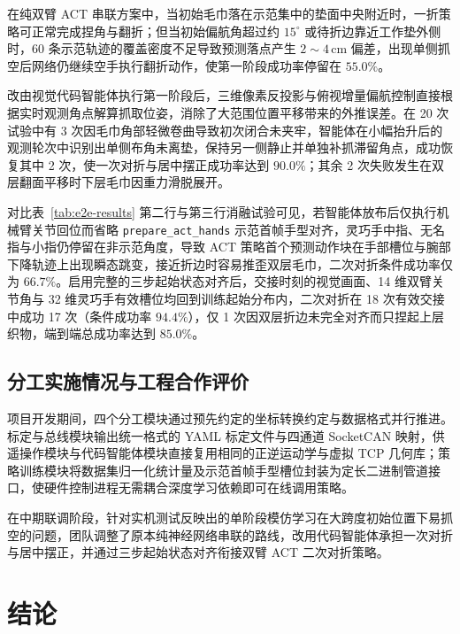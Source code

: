 在纯双臂 ACT 串联方案中，当初始毛巾落在示范集中的垫面中央附近时，一折策略可正常完成捏角与翻折；但当初始偏航角超过约 $15^{\circ}$ 或待折边靠近工作垫外侧时，60 条示范轨迹的覆盖密度不足导致预测落点产生 $2\sim 4\,\mathrm{cm}$ 偏差，出现单侧抓空后网络仍继续空手执行翻折动作，使第一阶段成功率停留在 $55.0\%$。

改由视觉代码智能体执行第一阶段后，三维像素反投影与俯视增量偏航控制直接根据实时观测角点解算抓取位姿，消除了大范围位置平移带来的外推误差。在 20 次试验中有 3 次因毛巾角部轻微卷曲导致初次闭合未夹牢，智能体在小幅抬升后的观测轮次中识别出单侧布角未离垫，保持另一侧静止并单独补抓滞留角点，成功恢复其中 2 次，使一次对折与居中摆正成功率达到 $90.0\%$；其余 2 次失败发生在双层翻面平移时下层毛巾因重力滑脱展开。

对比表~\ref{tab:e2e-results} 第二行与第三行消融试验可见，若智能体放布后仅执行机械臂关节回位而省略 \texttt{prepare\_act\_hands} 示范首帧手型对齐，灵巧手中指、无名指与小指仍停留在非示范角度，导致 ACT 策略首个预测动作块在手部槽位与腕部下降轨迹上出现瞬态跳变，接近折边时容易推歪双层毛巾，二次对折条件成功率仅为 $66.7\%$。启用完整的三步起始状态对齐后，交接时刻的视觉画面、14 维双臂关节角与 32 维灵巧手有效槽位均回到训练起始分布内，二次对折在 18 次有效交接中成功 17 次（条件成功率 $94.4\%$），仅 1 次因双层折边未完全对齐而只捏起上层织物，端到端总成功率达到 $85.0\%$。


\subsection{分工实施情况与工程合作评价}
\label{subsec:team-eval}

项目开发期间，四个分工模块通过预先约定的坐标转换约定与数据格式并行推进。标定与总线模块输出统一格式的 YAML 标定文件与四通道 SocketCAN 映射，供遥操作模块与代码智能体模块直接复用相同的正逆运动学与虚拟 TCP 几何库；策略训练模块将数据集归一化统计量及示范首帧手型槽位封装为定长二进制管道接口，使硬件控制进程无需耦合深度学习依赖即可在线调用策略。

在中期联调阶段，针对实机测试反映出的单阶段模仿学习在大跨度初始位置下易抓空的问题，团队调整了原本纯神经网络串联的路线，改用代码智能体承担一次对折与居中摆正，并通过三步起始状态对齐衔接双臂 ACT 二次对折策略。


\section{结论}
\label{sec:conclusion}

